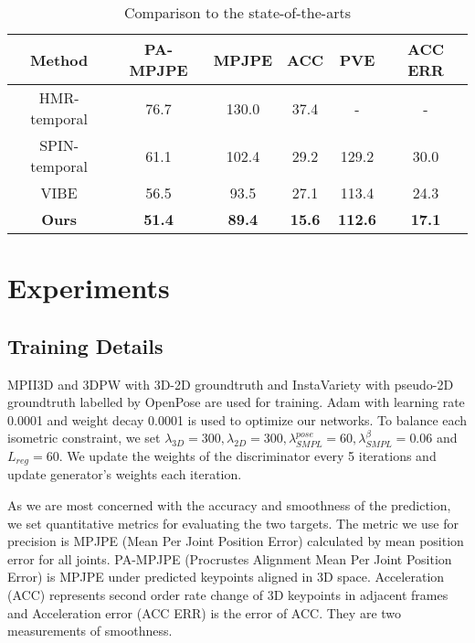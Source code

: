 \documentclass{svproc}
\begin{document}
\begin{table}
\centering
\caption{Comparison to the state-of-the-arts}
\label{table}
\small
\setlength{\tabcolsep}{3pt}
\begin{tabular}{|c|c|c|c|c|c|}
\hline
Method & 
PA-MPJPE & 
MPJPE & ACC & PVE & ACC ERR \\
\hline
HMR-temporal \cite{kanazawa2018end} & 
76.7 & 
130.0 & 
37.4 & - & - \\
\hline
SPIN-temporal \cite{kolotouros2019learning} & 
61.1 & 
102.4 & 
29.2 & 129.2 & 30.0 \\
\hline
VIBE \cite{kocabas2020vibe} & 
56.5 & 
93.5 & 
27.1 & 113.4 & 24.3 \\
\hline
\textbf{Ours} & 
\textbf{51.4} & 
\textbf{89.4} & 
\textbf{15.6} & 
\textbf{112.6} & 
\textbf{17.1} \\
\hline
\end{tabular}
\label{tab1}
\end{table}






\section{Experiments}
\subsection{Training Details}

MPII3D\cite{mehta2017monocular} and 3DPW \cite{von2018recovering} with 3D-2D groundtruth and InstaVariety\cite{kanazawa2019learning} with pseudo-2D groundtruth labelled by OpenPose\cite{cao2017realtime} are used for training. Adam\cite{kingma2014adam} with learning rate 0.0001 and weight decay 0.0001 is used to optimize our networks. To balance each isometric constraint, we set $\lambda_{3D}=300, \lambda_{2D}=300, \lambda_{SMPL}^{pose}=60, \lambda_{SMPL}^{\beta}=0.06$ and $L_{reg}=60$. We update the weights of the discriminator every 5 iterations and update generator's weights each iteration.


As we are most concerned with the accuracy and smoothness of the prediction, we set quantitative metrics for evaluating the two targets. The metric we use for precision is MPJPE (Mean Per Joint Position Error) calculated by mean position error for all joints. PA-MPJPE (Procrustes Alignment Mean Per Joint Position Error) is MPJPE under predicted keypoints aligned in 3D space. Acceleration (ACC) represents second order rate change of 3D keypoints in adjacent frames and Acceleration error (ACC ERR) is the error of ACC. They are two measurements of smoothness. 
\end{document}
